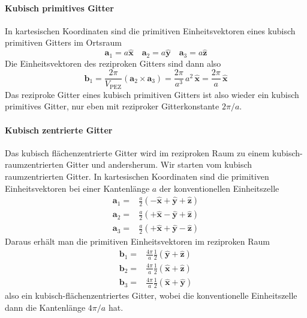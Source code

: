 \paragraph{Kubisch primitives Gitter} In kartesischen Koordinaten sind die primitiven Einheitsvektoren eines kubisch primitiven Gitters im Ortsraum
\begin{equation}
 \mathbf{a}_1 = a \hat{\mathbf{x}} \quad \mathbf{a}_2 = a \hat{\mathbf{y}}
 \quad \mathbf{a}_3 = a \hat{\mathbf{z}}
\end{equation}
Die Einheitsvektoren des reziproken Gitters sind dann also
\begin{equation}
  \mathbf{b}_1 = \frac{2 \pi}{V_\text{PEZ}} \left(  \mathbf{a}_2 \times \mathbf{a}_3 \right)  = \frac{2 \pi}{a^3} \, a^2  \, \hat{\mathbf{x}} = \frac{2 \pi}{a}  \, \hat{\mathbf{x}} 
\end{equation}
Das reziproke Gitter eines kubisch primitiven Gitters ist also wieder ein kubisch primitives Gitter, nur eben mit reziproker Gitterkonstante $2 \pi / a$.


\paragraph{Kubisch zentrierte  Gitter} Das kubisch flächenzentrierte Gitter wird im reziproken Raum zu einem kubisch-raumzentrierten Gitter und andersherum. Wir starten vom kubisch raumzentrierten Gitter. In kartesischen Koordinaten sind die primitiven Einheitsvektoren bei einer Kantenlänge $a$ der konventionellen Einheitszelle
\begin{align}
 \mathbf{a}_1 = & \frac{a}{2} \left( - \hat{\mathbf{x}} + \hat{\mathbf{y}} +\hat{\mathbf{z}} \right) \\
  \mathbf{a}_2 = & \frac{a}{2} \left( + \hat{\mathbf{x}} - \hat{\mathbf{y}} +\hat{\mathbf{z}} \right) \\
   \mathbf{a}_3 = & \frac{a}{2} \left( + \hat{\mathbf{x}} + \hat{\mathbf{y}} - \hat{\mathbf{z}} \right) 
\end{align}
Daraus erhält man die primitiven Einheitsvektoren im reziproken Raum
\begin{align}
\mathbf{b}_1 = & \frac{4\pi}{a} \frac{1}{2} \left( \hat{\mathbf{y}} + \hat{\mathbf{z}}  \right) \\
\mathbf{b}_2 = & \frac{4\pi}{a} \frac{1}{2} \left( \hat{\mathbf{x}} + \hat{\mathbf{z}}  \right) \\
\mathbf{b}_3 = & \frac{4\pi}{a} \frac{1}{2} \left( \hat{\mathbf{x}} + \hat{\mathbf{y}}  \right) 
\end{align}
also ein kubisch-flächenzentriertes Gitter, wobei die konventionelle Einheitszelle dann die Kantenlänge $4 \pi / a$ hat.


